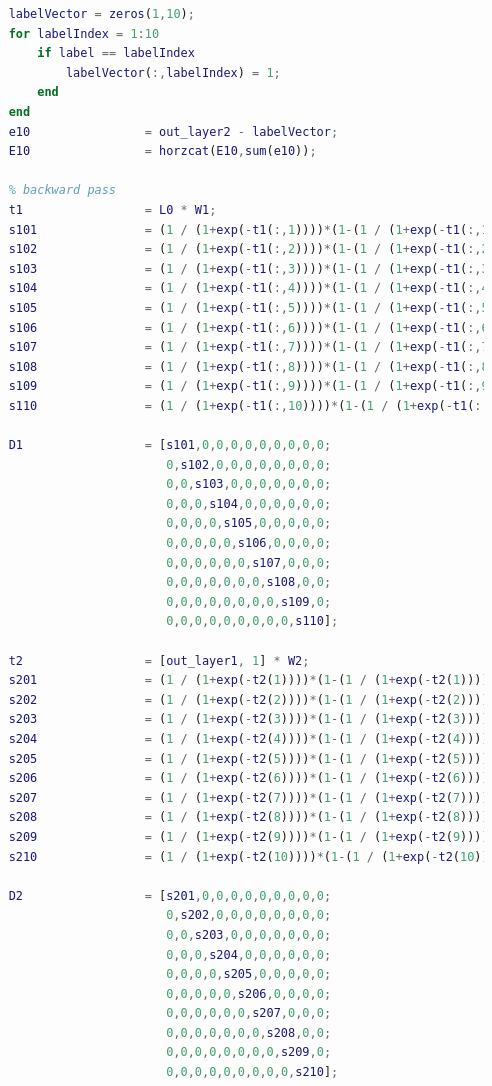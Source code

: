 \documentclass[12pt]{article}
\begin{document}
\begin{lstlisting}[language=Matlab]
    % error calculation
    labelVector = zeros(1,10);
    for labelIndex = 1:10
        if label == labelIndex
            labelVector(:,labelIndex) = 1;
        end
    end
    e10                = out_layer2 - labelVector;
    E10                = horzcat(E10,sum(e10));
    
    % backward pass
    t1                 = L0 * W1;
    s101               = (1 / (1+exp(-t1(:,1))))*(1-(1 / (1+exp(-t1(:,1)))));
    s102               = (1 / (1+exp(-t1(:,2))))*(1-(1 / (1+exp(-t1(:,2)))));
    s103               = (1 / (1+exp(-t1(:,3))))*(1-(1 / (1+exp(-t1(:,3)))));
    s104               = (1 / (1+exp(-t1(:,4))))*(1-(1 / (1+exp(-t1(:,4)))));
    s105               = (1 / (1+exp(-t1(:,5))))*(1-(1 / (1+exp(-t1(:,5)))));
    s106               = (1 / (1+exp(-t1(:,6))))*(1-(1 / (1+exp(-t1(:,6)))));
    s107               = (1 / (1+exp(-t1(:,7))))*(1-(1 / (1+exp(-t1(:,7)))));
    s108               = (1 / (1+exp(-t1(:,8))))*(1-(1 / (1+exp(-t1(:,8)))));
    s109               = (1 / (1+exp(-t1(:,9))))*(1-(1 / (1+exp(-t1(:,9)))));
    s110               = (1 / (1+exp(-t1(:,10))))*(1-(1 / (1+exp(-t1(:,10)))));
       
    D1                 = [s101,0,0,0,0,0,0,0,0,0;
                          0,s102,0,0,0,0,0,0,0,0;
                          0,0,s103,0,0,0,0,0,0,0;
                          0,0,0,s104,0,0,0,0,0,0;
                          0,0,0,0,s105,0,0,0,0,0;
                          0,0,0,0,0,s106,0,0,0,0;
                          0,0,0,0,0,0,s107,0,0,0;
                          0,0,0,0,0,0,0,s108,0,0;
                          0,0,0,0,0,0,0,0,s109,0;
                          0,0,0,0,0,0,0,0,0,s110];
    
    t2                 = [out_layer1, 1] * W2;
    s201               = (1 / (1+exp(-t2(1))))*(1-(1 / (1+exp(-t2(1)))));
    s202               = (1 / (1+exp(-t2(2))))*(1-(1 / (1+exp(-t2(2)))));
    s203               = (1 / (1+exp(-t2(3))))*(1-(1 / (1+exp(-t2(3)))));
    s204               = (1 / (1+exp(-t2(4))))*(1-(1 / (1+exp(-t2(4)))));
    s205               = (1 / (1+exp(-t2(5))))*(1-(1 / (1+exp(-t2(5)))));
    s206               = (1 / (1+exp(-t2(6))))*(1-(1 / (1+exp(-t2(6)))));
    s207               = (1 / (1+exp(-t2(7))))*(1-(1 / (1+exp(-t2(7)))));
    s208               = (1 / (1+exp(-t2(8))))*(1-(1 / (1+exp(-t2(8)))));
    s209               = (1 / (1+exp(-t2(9))))*(1-(1 / (1+exp(-t2(9)))));
    s210               = (1 / (1+exp(-t2(10))))*(1-(1 / (1+exp(-t2(10)))));
    
    D2                 = [s201,0,0,0,0,0,0,0,0,0;
                          0,s202,0,0,0,0,0,0,0,0;
                          0,0,s203,0,0,0,0,0,0,0;
                          0,0,0,s204,0,0,0,0,0,0;
                          0,0,0,0,s205,0,0,0,0,0;
                          0,0,0,0,0,s206,0,0,0,0;
                          0,0,0,0,0,0,s207,0,0,0;
                          0,0,0,0,0,0,0,s208,0,0;
                          0,0,0,0,0,0,0,0,s209,0;
                          0,0,0,0,0,0,0,0,0,s210];
    

\end{lstlisting}
\end{document}

